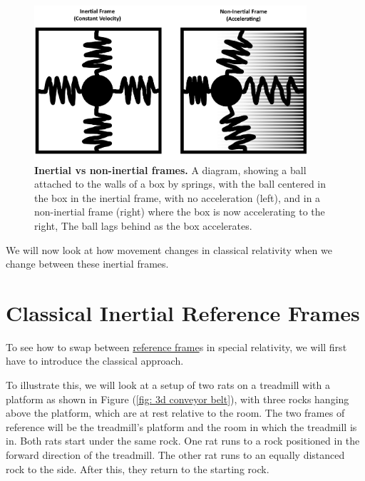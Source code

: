 \begin{figure}[H]
	\centering
	\includegraphics[width = 0.9\textwidth]{images/pdf/Spring_boxes.pdf}
	\caption{\textbf{Inertial vs non-inertial frames.} A diagram, showing a ball attached to the walls of a box by springs, with the ball centered in the box in the inertial frame, with no acceleration (left), and in a non-inertial frame (right) where the box is now accelerating to the right, The ball lags behind as the box accelerates.}
	\label{fig: spring boxes}
\end{figure}

We will now look at how movement changes in classical relativity when we change between these inertial frames.


\section{Classical Inertial Reference Frames} \label{sect: Classical Inertial Reference Frames}

To see how to swap between \hyperlink{def-Reference-frame}{reference frame}s in special relativity, we will first have to introduce the classical approach.

To illustrate this, we will look at a setup of two rats on a treadmill with a platform as shown in Figure (\ref{fig: 3d conveyor belt}), with three rocks hanging above the platform, which are at rest relative to the room.
The two frames of reference will be the treadmill's platform and the room in which the treadmill is in.
Both rats start under the same rock.
One rat runs to a rock positioned in the forward direction of the treadmill.
The other rat runs to an equally distanced rock to the side.
After this, they return to the starting rock.

